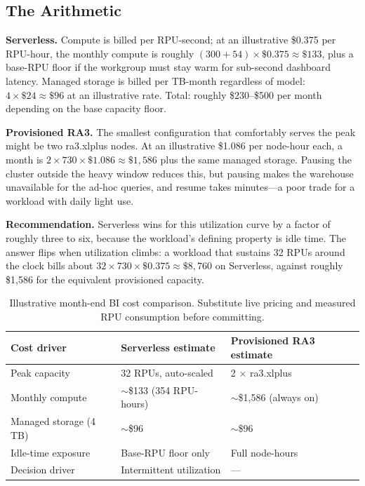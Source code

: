 \subsection{The Arithmetic}
\textbf{Serverless.} Compute is billed per RPU-second; at an illustrative \$0.375 per RPU-hour, the monthly compute is roughly $(300 + 54) \times \$0.375 \approx \$133$, plus a base-RPU floor if the workgroup must stay warm for sub-second dashboard latency. Managed storage is billed per TB-month regardless of model: $4 \times \$24 \approx \$96$ at an illustrative rate. Total: roughly \$230--\$500 per month depending on the base capacity floor.

\textbf{Provisioned RA3.} The smallest configuration that comfortably serves the peak might be two ra3.xlplus nodes. At an illustrative \$1.086 per node-hour each, a month is $2 \times 730 \times \$1.086 \approx \$1{,}586$ plus the same managed storage. Pausing the cluster outside the heavy window reduces this, but pausing makes the warehouse unavailable for the ad-hoc queries, and resume takes minutes---a poor trade for a workload with daily light use.

\textbf{Recommendation.} Serverless wins for this utilization curve by a factor of roughly three to six, because the workload's defining property is idle time. The answer flips when utilization climbs: a workload that sustains 32 RPUs around the clock bills about $32 \times 730 \times \$0.375 \approx \$8{,}760$ on Serverless, against roughly \$1{,}586 for the equivalent provisioned capacity.

\begin{table}[H]
\centering
\small
\begin{tabular}{@{}p{4.2cm}p{3.6cm}p{4.6cm}@{}}
\toprule
\textbf{Cost driver} & \textbf{Serverless estimate} & \textbf{Provisioned RA3 estimate} \\
\midrule
Peak capacity & 32 RPUs, auto-scaled & 2 $\times$ ra3.xlplus \\
Monthly compute & $\sim$\$133 (354 RPU-hours) & $\sim$\$1{,}586 (always on) \\
Managed storage (4 TB) & $\sim$\$96 & $\sim$\$96 \\
Idle-time exposure & Base-RPU floor only & Full node-hours \\
Decision driver & Intermittent utilization & --- \\
\bottomrule
\end{tabular}
\caption{Illustrative month-end BI cost comparison. Substitute live pricing and measured RPU consumption before committing.}
\label{tab:ch5-cost-model}
\end{table}

